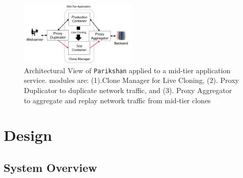 
\begin{figure}[h]
  \begin{center}
    \includegraphics[width=0.5\textwidth]{figs/arch.png}
    \caption{Architectural View of \texttt{Parikshan} applied to a mid-tier application service. \parikshan modules are: (1).Clone Manager for Live Cloning, (2). Proxy Duplicator to duplicate network traffic, and (3). Proxy Aggregator to aggregate and replay network traffic from mid-tier clones}
    \label{fig:workflow}
  \end{center}
\end{figure}

\section{Design}
\label{sec:design}



\subsection{System Overview}
\label{sec:systemOverview}

